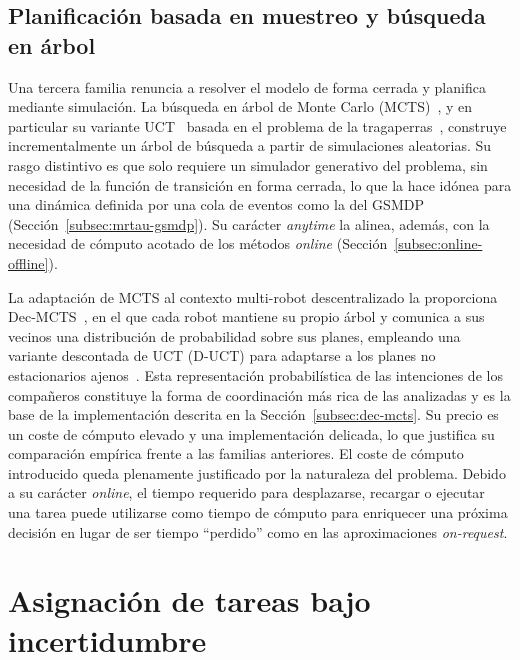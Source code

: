 \subsection{Planificación basada en muestreo y búsqueda en árbol} \label{subsec:ea-muestreo}
 
Una tercera familia renuncia a resolver el modelo de forma cerrada y planifica mediante simulación. La búsqueda en árbol de Monte Carlo (MCTS)~\cite{browne2012survey}, y en particular su variante UCT~\cite{kocsis2006bandit} basada en el problema de la tragaperras~\cite{auer2002ucb}, construye incrementalmente un árbol de búsqueda a partir de simulaciones aleatorias. Su rasgo distintivo es que solo requiere un simulador generativo del problema, sin necesidad de la función de transición en forma cerrada, lo que la hace idónea para una dinámica definida por una cola de eventos como la del GSMDP (Sección~\ref{subsec:mrtau-gsmdp}). Su carácter \textit{anytime} la alinea, además, con la necesidad de cómputo acotado de los métodos \textit{online} (Sección~\ref{subsec:online-offline}).
 
La adaptación de MCTS al contexto multi-robot descentralizado la proporciona Dec-MCTS~\cite{best2019decmcts}, en el que cada robot mantiene su propio árbol y comunica a sus vecinos una distribución de probabilidad sobre sus planes, empleando una variante descontada de UCT (D-UCT) para adaptarse a los planes no estacionarios ajenos~\cite{garivier2011ducb}. Esta representación probabilística de las intenciones de los compañeros constituye la forma de coordinación más rica de las analizadas y es la base de la implementación descrita en la Sección~\ref{subsec:dec-mcts}. Su precio es un coste de cómputo elevado y una implementación delicada, lo que justifica su comparación empírica frente a las familias anteriores. El coste de cómputo introducido queda plenamente justificado por la naturaleza del problema. Debido a su carácter \textit{online}, el tiempo requerido para desplazarse, recargar o ejecutar una tarea puede utilizarse como tiempo de cómputo para enriquecer una próxima decisión en lugar de ser tiempo ``perdido'' como en las aproximaciones \textit{on-request}.

\section{Asignación de tareas bajo incertidumbre} \label{sec:ea-incertidumbre}

